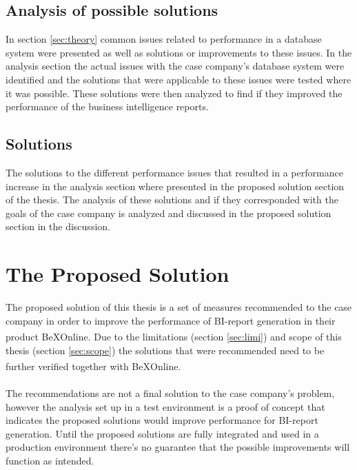 \documentclass{cslthse-msc}
\newcommand{\bex}{BeX\textsuperscript{\textregistered}}
\begin{document}
\subsection{Analysis of possible solutions}
In section \ref{sec:theory} common issues related to performance in a database system were presented as well as solutions or improvements to these issues. In the analysis section the actual issues with the case company's database system were identified and the solutions that were applicable to these issues were tested where it was possible. These solutions were then analyzed to find if they improved the performance of the business intelligence reports.

\subsection{Solutions}
The solutions to the different performance issues that resulted in a performance increase in the analysis section where presented in the proposed solution section of the thesis. The analysis of these solutions and if they corresponded with the goals of the case company is analyzed and discussed in the proposed solution section in the discussion.

\section{The Proposed Solution}
The proposed solution of this thesis is a set of measures recommended to the case company in order to improve the performance of BI-report generation in their product \bex Online. Due to the limitations (section \ref{sec:limi}) and scope of this thesis (section \ref{sec:scope}) the solutions that were recommended need to be further verified together with \bex Online.\\\\
The recommendations are not a final solution to the case company's problem, however the analysis set up in a test environment is a proof of concept that indicates the proposed solutions would improve performance for BI-report generation. Until the proposed solutions are fully integrated and used in a production environment there's no guarantee that the possible improvements will function as intended.\\\\
\end{document}
